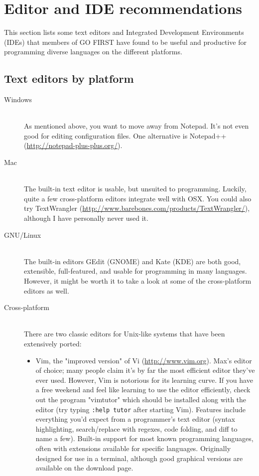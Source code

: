 \documentclass[12pt]{article}
\begin{document}
\appendix
\section{Editor and IDE recommendations}
\label{sec:editors}
This section lists some text editors and Integrated Development Environments (IDEs) that members of GO FIRST have found to be useful and productive for programming diverse languages on the different platforms.
\subsection{Text editors by platform}
\begin{description}
    \item[Windows] \hfill \\
        As mentioned above, you want to move away from Notepad. It's not even good for editing configuration files. One alternative is Notepad++ (\url{http://notepad-plus-plus.org/}). 
    \item[Mac] \hfill \\
        The built-in text editor is usable, but unsuited to programming. Luckily, quite a few cross-platform editors integrate well with OSX. You could also try TextWrangler (\url{http://www.barebones.com/products/TextWrangler/}), although I have personally never used it.
    \item[GNU/Linux] \hfill \\
        The built-in editors GEdit (GNOME) and Kate (KDE) are both good, extensible, full-featured, and usable for programming in many languages. However, it might be worth it to take a look at some of the cross-platform editors as well.
    \item[Cross-platform] \hfill \\
        There are two classic editors for Unix-like systems that have been extensively ported: 
        \begin{itemize}
            \item Vim, the "improved version" of Vi (\url{http://www.vim.org}). Max's editor of choice; many people claim it's by far the most efficient editor they've ever used. However, Vim is notorious for its learning curve. If you have a free weekend and feel like learning to use the editor efficiently, check out the program "vimtutor" which should be installed along with the editor (try typing \texttt{:help tutor} after starting Vim). Features include everything you'd expect from a programmer's text editor (syntax highlighting, search/replace with regexes, code folding, and diff to name a few). Built-in support for most known programming languages, often with extensions available for specific languages. Originally designed for use in a terminal, although good graphical versions are available on the download page.

\end{itemize}
\end{description}
\end{document}
